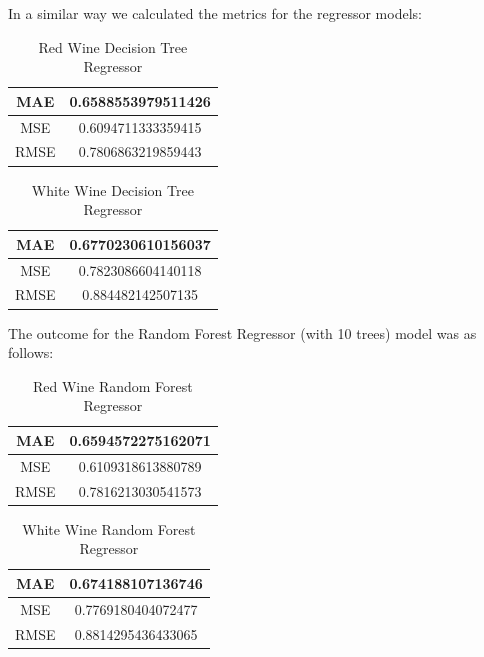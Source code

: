 \documentclass{ufazreport}
\begin{document}
In a similar way we calculated the metrics for the regressor models: 
\begin{table}[H]
    \centering
    \begin{tabular}{|c|c|}
        \hline
        MAE & 0.6588553979511426     \\
        \hline
        MSE & 0.6094711333359415     \\
        \hline
        RMSE & 0.7806863219859443 \\
        \hline    
    \end{tabular}
    \caption{Red Wine Decision Tree Regressor}
    \label{tab:my_label}
\end{table}
\begin{table}[H]
    \centering
    \begin{tabular}{|c|c|}
        \hline
        MAE & 0.6770230610156037     \\
        \hline
        MSE & 0.7823086604140118     \\
        \hline
        RMSE & 0.884482142507135 \\
        \hline    
    \end{tabular}
    \caption{White Wine Decision Tree Regressor}
    \label{tab:my_label}
\end{table}

The outcome for the Random Forest Regressor (with 10 trees) model was as follows:
\begin{table}[H]
    \centering
    \begin{tabular}{|c|c|}
        \hline
        MAE & 0.6594572275162071     \\
        \hline
        MSE & 0.6109318613880789     \\
        \hline
        RMSE & 0.7816213030541573 \\
        \hline    
    \end{tabular}
    \caption{Red Wine Random Forest Regressor}
    \label{tab:my_label}
\end{table}

\begin{table}[H]
    \centering
    \begin{tabular}{|c|c|}
        \hline
        MAE & 0.674188107136746     \\
        \hline
        MSE & 0.7769180404072477     \\
        \hline
        RMSE & 0.8814295436433065 \\
        \hline    
    \end{tabular}
    \caption{White Wine Random Forest Regressor}
    \label{tab:my_label}
\end{table}
\end{document}
